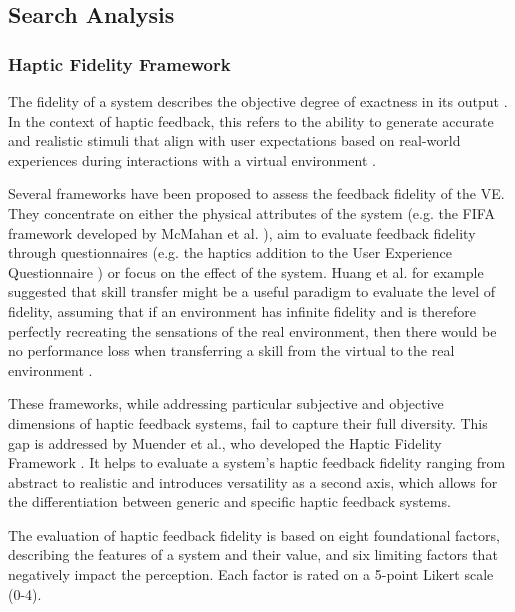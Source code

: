 \subsection{Search Analysis}
\subsubsection{Haptic Fidelity Framework}


The fidelity of a system describes the objective degree of exactness in its output \cite{McMahan2011ExploringGames}. 
In the context of haptic feedback, this refers to the ability to generate accurate and realistic stimuli that align with user expectations based on real-world experiences during interactions with a virtual environment \cite{Muender2022HapticReality}. 

Several frameworks have been proposed to assess the feedback fidelity of the VE. They concentrate on either the physical attributes of the system (e.g. the FIFA framework developed by McMahan et al. \cite{McMahan2011ExploringGames}), aim to evaluate feedback fidelity through questionnaires (e.g. the haptics addition \cite{Boos2017ErweiterungHaptik} to the User Experience Questionnaire \cite{Laugwitz2008ConstructionQuestionnaire}) or focus on the effect of the system. Huang et al. for example suggested that skill transfer might be a useful paradigm to evaluate the level of fidelity, assuming that if an environment has infinite fidelity and is therefore perfectly recreating the sensations of the real environment, then there would be no performance loss when transferring a skill from the virtual to the real environment \cite{Huang2006}.

These frameworks, while addressing particular subjective and objective dimensions of haptic feedback systems, fail to capture their full diversity. This gap is addressed by Muender et al., who developed the Haptic Fidelity Framework \cite{Muender2022HapticReality}. It helps to evaluate a system's haptic feedback fidelity ranging from abstract to realistic and introduces versatility as a second axis, which allows for the differentiation between generic and specific haptic feedback systems. 

The evaluation of haptic feedback fidelity is based on eight foundational factors, describing the features of a system and their value, and six limiting factors that negatively impact the perception. Each factor is rated on a 5-point Likert scale (0-4). 

